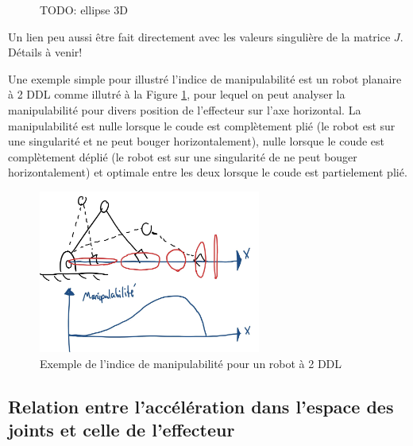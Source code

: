 \begin{figure}[H]
	\centering
	\caption{TODO: ellipse 3D}
\end{figure}

Un lien peu aussi être fait directement avec les valeurs singulière de la matrice $J$. Détails à venir!

\begin{example}

Une exemple simple pour illustré l'indice de manipulabilité est un robot planaire à 2 DDL comme illutré à la Figure \ref{fig:2dof_manip_graph}, pour lequel on peut analyser la manipulabilité pour divers position de l'effecteur sur l'axe horizontal. La manipulabilité est nulle lorsque le coude est complètement plié (le robot est sur une singularité et ne peut bouger horizontalement), nulle lorsque le coude est complètement déplié (le robot est sur une singularité de ne peut bouger horizontalement) et optimale entre les deux lorsque le coude est partielement plié.

\begin{figure}[H]
	\centering
		\includegraphics[width=0.65\textwidth]{fig/2dof_manip_graph.jpg}
	\caption{Exemple de l'indice de manipulabilité pour un robot à 2 DDL}
	\label{fig:2dof_manip_graph}
\end{figure}

\end{example}







\newpage
\subsection{Relation entre l'accélération dans l'espace des joints et celle de l'effecteur}
\label{sec:accjointspace}


